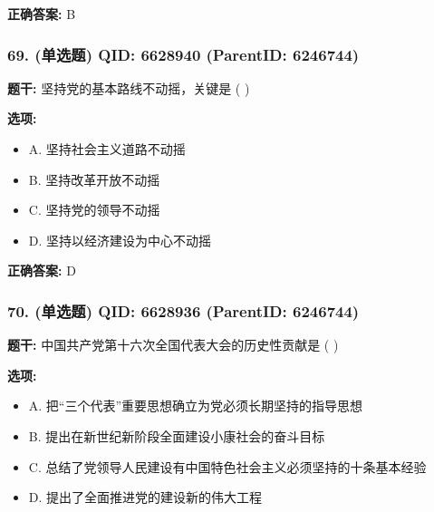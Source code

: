 \documentclass[12pt,UTF8]{ctexart}
\begin{document}
\textbf{正确答案:}
B

\vspace{0.3em}\hrulefill\vspace{0.7em}

\subsubsection*{69. (单选题) \small QID: 6628940 (ParentID: 6246744)}

\textbf{题干:}
坚持党的基本路线不动摇，关键是  ( )



\textbf{选项:}
\begin{itemize}[leftmargin=*]

  \item A. 坚持社会主义道路不动摇

  \item B. 坚持改革开放不动摇

  \item C. 坚持党的领导不动摇

  \item D. 坚持以经济建设为中心不动摇

\end{itemize}

\textbf{正确答案:}
D

\vspace{0.3em}\hrulefill\vspace{0.7em}

\subsubsection*{70. (单选题) \small QID: 6628936 (ParentID: 6246744)}

\textbf{题干:}
中国共产党第十六次全国代表大会的历史性贡献是  ( )



\textbf{选项:}
\begin{itemize}[leftmargin=*]

  \item A. 把“三个代表”重要思想确立为党必须长期坚持的指导思想

  \item B. 提出在新世纪新阶段全面建设小康社会的奋斗目标

  \item C. 总结了党领导人民建设有中国特色社会主义必须坚持的十条基本经验

  \item D. 提出了全面推进党的建设新的伟大工程

\end{itemize}
\end{document}
